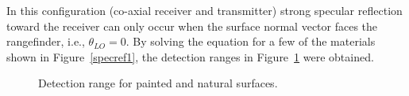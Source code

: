 In this configuration (co-axial receiver and transmitter) strong specular reflection toward the receiver can only occur when the surface normal vector faces the rangefinder, i.e., $\theta_{LO}=0$. By solving the equation for a few of the materials shown in Figure~\ref{specref1}, the detection ranges in Figure~\ref{specref2} were obtained.

\begin{figure}[h]
    \centering
    \caption{\label{specref2}Detection range for painted and natural surfaces.}
    \end{figure}

